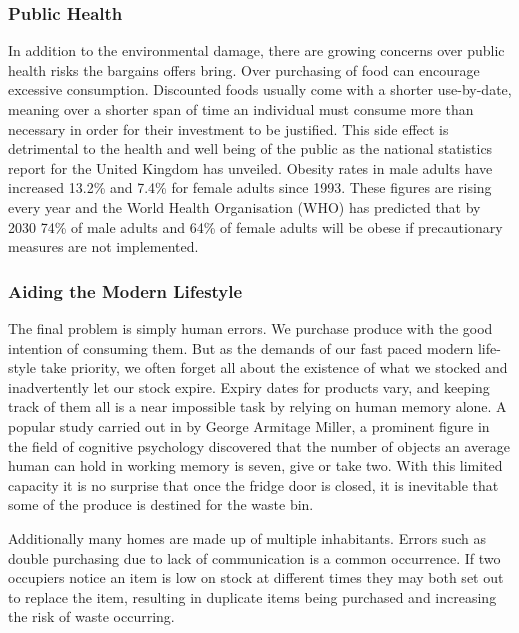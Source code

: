 \documentclass[a4paper, 11pt]{article}
\begin{document}
\subsubsection{Public Health}
In addition to the environmental damage, there are growing concerns over public health risks the bargains offers bring. Over purchasing of food can encourage excessive consumption. Discounted foods usually come with a shorter use-by-date, meaning over a shorter span of time an individual must consume more than necessary in order for their investment to be justified. This side effect is detrimental to the health and well being of the public as the national statistics report for the United Kingdom has unveiled. Obesity rates in male adults have increased 13.2\% and 7.4\% for female adults since 1993. These figures are rising every year and the World Health Organisation (WHO) has predicted that by 2030 74\% of male adults and 64\% of female adults will be obese if precautionary measures are not implemented.\cite{obesity} 

\subsubsection{Aiding the Modern Lifestyle}
The final problem is simply human errors. We purchase produce with the good intention of consuming them. But as the demands of our fast paced modern life-style take priority, we often forget all about the existence of what we stocked and inadvertently let our stock expire. Expiry dates for products vary, and keeping track of them all is a near impossible task by relying on human memory alone. A popular study carried out in by George Armitage Miller, a prominent figure in the field of cognitive psychology discovered that the number of objects an average human can hold in working memory is seven, give or take two\cite{memory}. With this limited capacity it is no surprise that once the fridge door is closed, it is inevitable that some of the produce is destined for the waste bin.

Additionally many homes are made up of multiple inhabitants. Errors such as double purchasing due to lack of communication is a common occurrence. If two occupiers notice an item is low on stock at different times they may both set out to replace the item, resulting in duplicate items being purchased and increasing the risk of waste occurring. 


\vspace{\baselineskip}
\vspace{\baselineskip}
\end{document}
